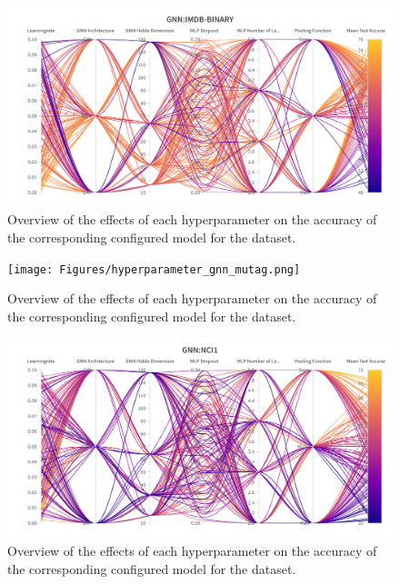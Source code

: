 \begin{figure}[H]
    \centering
    \includegraphics[width=\textwidth]{Figures/hyperparameter_gnn_imdb.png}
    \caption{Overview of the effects of each hyperparameter on the accuracy of the corresponding configured \gnn model for the \imdb dataset.}
\end{figure}

\begin{figure}[H]
    \centering
    \texttt{[image: Figures/hyperparameter\_gnn\_mutag.png]}
    \vspace*{-30pt}
    \caption{Overview of the effects of each hyperparameter on the accuracy of the corresponding configured \gnn model for the \mutag dataset.}
\end{figure}

\begin{figure}[H]
    \centering
    \includegraphics[width=\textwidth]{Figures/hyperparameter_gnn_nci1.png}
    \vspace*{-30pt}
    \caption{Overview of the effects of each hyperparameter on the accuracy of the corresponding configured \gnn model for the \nci dataset.}
\end{figure}

